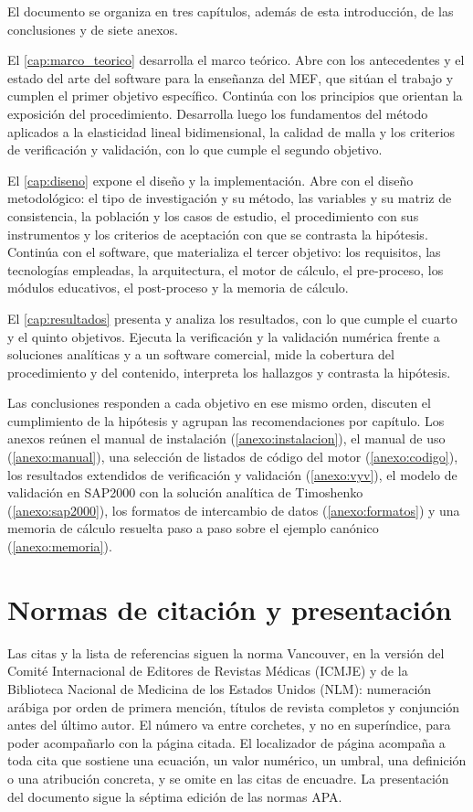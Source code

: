 El documento se organiza en tres capítulos, además de esta introducción, de las conclusiones y de siete anexos.

El \autoref{cap:marco_teorico} desarrolla el marco teórico. Abre con los antecedentes y el estado del arte del software para la enseñanza del MEF, que sitúan el trabajo y cumplen el primer objetivo específico. Continúa con los principios que orientan la exposición del procedimiento. Desarrolla luego los fundamentos del método aplicados a la elasticidad lineal bidimensional, la calidad de malla y los criterios de verificación y validación, con lo que cumple el segundo objetivo.

El \autoref{cap:diseno} expone el diseño y la implementación. Abre con el diseño metodológico: el tipo de investigación y su método, las variables y su matriz de consistencia, la población y los casos de estudio, el procedimiento con sus instrumentos y los criterios de aceptación con que se contrasta la hipótesis. Continúa con el software, que materializa el tercer objetivo: los requisitos, las tecnologías empleadas, la arquitectura, el motor de cálculo, el pre-proceso, los módulos educativos, el post-proceso y la memoria de cálculo.

El \autoref{cap:resultados} presenta y analiza los resultados, con lo que cumple el cuarto y el quinto objetivos. Ejecuta la verificación y la validación numérica frente a soluciones analíticas y a un software comercial, mide la cobertura del procedimiento y del contenido, interpreta los hallazgos y contrasta la hipótesis.

Las conclusiones responden a cada objetivo en ese mismo orden, discuten el cumplimiento de la hipótesis y agrupan las recomendaciones por capítulo. Los anexos reúnen el manual de instalación (\autoref{anexo:instalacion}), el manual de uso (\autoref{anexo:manual}), una selección de listados de código del motor (\autoref{anexo:codigo}), los resultados extendidos de verificación y validación (\autoref{anexo:vyv}), el modelo de validación en SAP2000 con la solución analítica de Timoshenko (\autoref{anexo:sap2000}), los formatos de intercambio de datos (\autoref{anexo:formatos}) y una memoria de cálculo resuelta paso a paso sobre el ejemplo canónico (\autoref{anexo:memoria}).

\section*{Normas de citación y presentación}

Las citas y la lista de referencias siguen la norma Vancouver, en la versión del Comité Internacional de Editores de Revistas Médicas (ICMJE) y de la Biblioteca Nacional de Medicina de los Estados Unidos (NLM): numeración arábiga por orden de primera mención, títulos de revista completos y conjunción antes del último autor. El número va entre corchetes, y no en superíndice, para poder acompañarlo con la página citada. El localizador de página acompaña a toda cita que sostiene una ecuación, un valor numérico, un umbral, una definición o una atribución concreta, y se omite en las citas de encuadre. La presentación del documento sigue la séptima edición de las normas APA.
